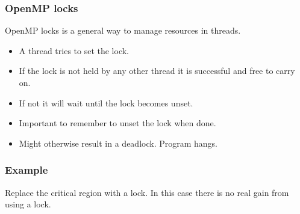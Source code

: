 \subsubsection{OpenMP locks}\label{openmp-locks}

OpenMP locks is a general way to manage resources in threads.

\begin{itemize}
\itemsep1pt\parskip0pt
\item
  A thread tries to set the lock.
\item
  If the lock is not held by any other thread it is successful and free
  to carry on.
\item
  If not it will wait until the lock becomes unset.
\item
  Important to remember to unset the lock when done.
\item
  Might otherwise result in a deadlock. Program hangs.
\end{itemize}

\subsubsection{Example}\label{example-2}

Replace the critical region with a lock. In this case there is no real
gain from using a lock.

\begin{Shaded}
\begin{Highlighting}[]

   
\NormalTok{\{}
     
      \NormalTok{;}
      
    \NormalTok{;}
    \NormalTok{;}
    \NormalTok{\{}
         \NormalTok{(} 
        \NormalTok{\{}
            \NormalTok{);}
            \NormalTok{/(} 
        \NormalTok{\}}
    \NormalTok{\}}
     
\NormalTok{\}}
\end{Highlighting}
\end{Shaded}


